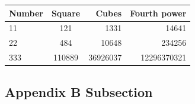 \documentclass[ms-thesis,12pt,mathdesign]{ndsu-thesis-2022}
\begin{document}
\begin{appendixtable}[h]
\centering
\caption{Squares and cubes named appendix table using \texttt{siunitx} package.}
\setlength{\tabcolsep}{7.1ex}
\begin{tabular}{@{\hspace{2ex}} lcrr @{\hspace{2ex}}}
\toprule
Number & Square        & Cubes          & Fourth power\\
\midrule
11 	   & 121   			       & \num{1331} 		   & \num{14641}\\
22 	   & 484  			        & \num{10648}		   & \num{234256}\\
333 	  & \num{110889}  & \num{36926037}	& \num{12296370321}\\
\bottomrule
\end{tabular}
\label{tab:ap2}
\end{appendixtable}

\subsection{Appendix B Subsection}
\kant[11]

\closeappendices   %
\end{document}
